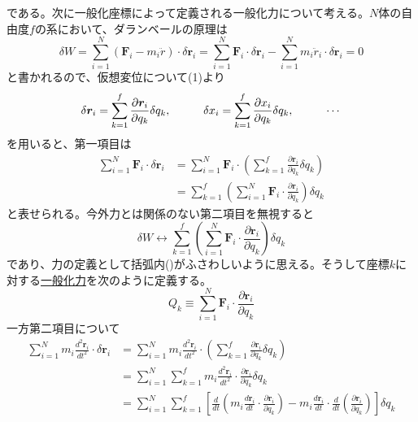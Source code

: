 \documentclass{jsarticle}
\begin{document}
である。次に一般化座標によって定義される一般化力について考える。\(N\)体の自由度\(f\)の系において、ダランベールの原理は
\[\delta W=\sum_{i=1}^{N}(\bm{F}_{i}-m_{i}{\ddot{r}})\cdot\delta\bm{r}_{i}=\sum_{i=1}^{N}\bm{F}_{i}\cdot\delta\bm{r}_{i}-\sum_{i=1}^{N}m_{i}\ddot{r}_{i}\cdot\delta\bm{r}_{i}=0\]
と書かれるので、仮想変位について(1)より
\begin{equation}
\delta\bm{r}_{i}=\sum_{k=1}^{f}\frac{\partial\bm{r}_{i}}{\partial q_{k}}\delta q_{k},\hspace{10mm}\delta x_{i}=\sum_{k=1}^{f}\frac{\partial x_{i}}{\partial q_{k}}\delta q_{k},\hspace{10mm}\cdots
\end{equation}
を用いると、第一項目は
\begin{align*}
\sum_{i=1}^{N}\bm{F}_{i}\cdot\delta\bm{r}_{i}&=\sum_{i=1}^{N}\bm{F}_{i}\cdot\left(\sum_{k=1}^{f}\frac{\partial\bm{r}_{i}}{\partial q_{k}}\delta q_{k}\right)\\
&=\sum_{k=1}^{f}\left(\sum_{i=1}^{N}\bm{F}_{i}\cdot\frac{\partial\bm{r}_{i}}{\partial q_{k}}\right)\delta q_{k}
\end{align*}
と表せられる。今外力とは関係のない第二項目を無視すると
\begin{equation}
\delta W\longleftrightarrow\sum_{k=1}^{f}\left(\sum_{i=1}^{N}\bm{F}_{i}\cdot\frac{\partial\bm{r}_{i}}{\partial q_{k}}\right)\delta q_{k}
\end{equation}
であり、力の定義として括弧内()がふさわしいように思える。そうして座標\(k\)に対する\underline{一般化力}を次のように定義する。\\
\begin{equation}
Q_{k}\equiv\sum_{i=1}^{N}\bm{F}_{i}\cdot\frac{\partial\bm{r}_{i}}{\partial q_{k}}
\end{equation}
一方第二項目について
\begin{align}
\sum_{i=1}^{N}m_{i}\frac{d^{2}\bm{r}_{i}}{dt^{2}}\cdot\delta\bm{r}_{i}&=\sum_{i=1}^{N}m_{i}\frac{d^{2}\bm{r}_{i}}{dt^{2}}\cdot\left(\sum_{k=1}^{f}\frac{\partial\bm{r}_{i}}{\partial q_{k}}\delta q_{k}\right)\nonumber\\
&=\sum_{i=1}^{N}\sum_{k=1}^{f}m_{i}\frac{d^{2}\bm{r}_{i}}{dt^{2}}\cdot\frac{\partial\bm{r}_{i}}{\partial q_{k}}\delta q_{k}\nonumber\\
&=\sum_{i=1}^{N}\sum_{k=1}^{f}\left[\frac{d}{dt}\left(m_{i}\frac{d\bm{r}_{i}}{dt}\cdot\frac{\partial\bm{r}_{i}}{\partial q_{k}}\right)-m_{i}\frac{d\bm{r}_{i}}{dt}\cdot\frac{d}{dt}\left(\frac{\partial\bm{r}_{i}}{\partial q_{k}}\right)\right]\delta q_{k}
\end{align}
\end{document}
